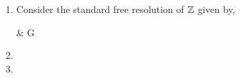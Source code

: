 \documentclass[12pt]{extarticle}
\begin{document}
 
\begin{enumerate}
\item Consider the standard free resolution of $\mathbb{Z}$ given by,
\begin{center}
\begin{tikz-cd}
\cdots \arrow[r] & G
\end{tikz-cd}
\end{center}

\item

\item
\end{enumerate}
\end{document}
